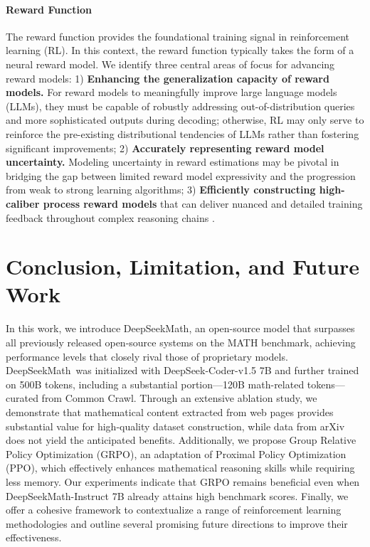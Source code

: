 \begin{itemize}[topsep=0pt]
\paragraph{Reward Function} The reward function provides the foundational training signal in reinforcement learning (RL). In this context, the reward function typically takes the form of a neural reward model. We identify three central areas of focus for advancing reward models: 1) \textbf{Enhancing the generalization capacity of reward models.} For reward models to meaningfully improve large language models (LLMs), they must be capable of robustly addressing out-of-distribution queries and more sophisticated outputs during decoding; otherwise, RL may only serve to reinforce the pre-existing distributional tendencies of LLMs rather than fostering significant improvements; 2) \textbf{Accurately representing reward model uncertainty.} Modeling uncertainty in reward estimations may be pivotal in bridging the gap between limited reward model expressivity and the progression from weak to strong learning algorithms; 3) \textbf{Efficiently constructing high-caliber process reward models} that can deliver nuanced and detailed training feedback throughout complex reasoning chains \citep{lightman2023let,wang2023math}.

\section{Conclusion, Limitation, and Future Work} 

In this work, we introduce DeepSeekMath, an open-source model that surpasses all previously released open-source systems on the MATH benchmark, achieving performance levels that closely rival those of proprietary models. DeepSeekMath~was initialized with DeepSeek-Coder-v1.5 7B and further trained on 500B tokens, including a substantial portion—120B math-related tokens—curated from Common Crawl. Through an extensive ablation study, we demonstrate that mathematical content extracted from web pages provides substantial value for high-quality dataset construction, while data from arXiv does not yield the anticipated benefits. Additionally, we propose Group Relative Policy Optimization (GRPO), an adaptation of Proximal Policy Optimization (PPO), which effectively enhances mathematical reasoning skills while requiring less memory. Our experiments indicate that GRPO remains beneficial even when DeepSeekMath-Instruct 7B already attains high benchmark scores. Finally, we offer a cohesive framework to contextualize a range of reinforcement learning methodologies and outline several promising future directions to improve their effectiveness.


\end{itemize}
